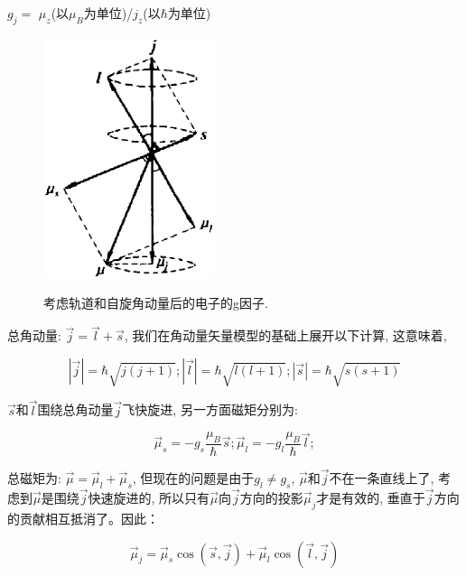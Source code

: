 \begin{center}
$g_j = $ $\mu_z$(以$\mu_B$为单位)/$j_z$(以$\hbar$为单位)
\end{center}

\begin{figure}[h]
\begin{center}
  \includegraphics[width=5cm]{Spin/lande_factor_gj.ps}\\
  \caption{考虑轨道和自旋角动量后的电子的g因子.}\label{one electron g factor}
\end{center}
\end{figure}


总角动量: $\vec j = \vec l + \vec s$,
我们在角动量矢量模型的基础上展开以下计算, 这意味着,

\begin{equation*}
|\vec j| =\hbar \sqrt{j(j+1)}; |\vec l| =\hbar \sqrt{l(l+1)}; |\vec
s| =\hbar \sqrt{s(s+1)}
\end{equation*}

$\vec s$和$\vec l$围绕总角动量$\vec j$飞快旋进, 另一方面磁矩分别为:

\begin{equation*}
\vec \mu_s = - g_s \frac{\mu_B}{\hbar}  \vec s; \vec \mu_l = - g_l
\frac{\mu_B}{\hbar}  \vec l;
\end{equation*}

总磁矩为: $\vec \mu = \vec \mu_l + \vec \mu_s$,
但现在的问题是由于$g_l \ne g_s$, $\vec \mu$和$\vec
j$不在一条直线上了, 考虑到$\vec \mu$是围绕$\vec j$快速旋进的,
所以只有$\vec \mu$向$\vec j$方向的投影$\vec \mu_j$才是有效的,
垂直于$\vec j$方向的贡献相互抵消了。因此：

\begin{equation*}
\vec \mu_j = \vec \mu_s \cos(\vec s, \vec j) + \vec \mu_l \cos(\vec
l, \vec j)
\end{equation*}

